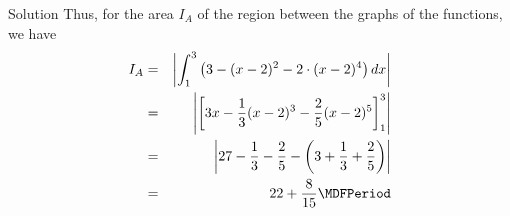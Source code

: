\begin{MExercises}
\begin{MExercise}
\begin{MHint}{Solution}
Thus, for the area $I_A$ of the region between the graphs of the functions, we have 
\begin{eqnarray*}
I_A & = & \left|\int_1^3 \left(3 - (x - 2)^2 - 2 \cdot (x - 2)^4\right) \MD x \right| \\
 & = & \left|\left[ 3 x - \frac{1}{3} (x - 2)^3 - \frac{2}{5} (x - 2)^5 \right]_{1}^{3} \right| \\
 & = & \left| 27 - \frac{1}{3} - \frac{2}{5} %
      - \left(3 + \frac{1}{3} + \frac{2}{5}\right) \right| \\
 & = & 22 + \frac{8}{15} \MDFPeriod %
\end{eqnarray*}
\end{MHint}
\end{MExercise}

%
%

\end{MExercises}
